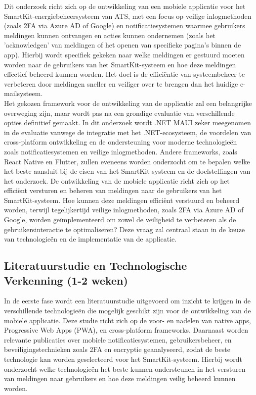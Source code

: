 \noindent Dit onderzoek richt zich op de ontwikkeling van een mobiele applicatie voor het SmartKit-energiebeheersysteem van ATS, met een focus op veilige inlogmethoden (zoals 2FA via Azure AD of Google) en notificatiesystemen waarmee gebruikers meldingen kunnen ontvangen en acties kunnen ondernemen (zoals het 'acknowledgen' van meldingen of het openen van specifieke pagina's binnen de app). Hierbij wordt specifiek gekeken naar welke meldingen er gestuurd moeten worden naar de gebruikers van het SmartKit-systeem en hoe deze meldingen effectief beheerd kunnen worden. Het doel is de efficiëntie van systeembeheer te verbeteren door meldingen sneller en veiliger over te brengen dan het huidige e-mailsysteem. \\

\noindent Het gekozen framework voor de ontwikkeling van de applicatie zal een belangrijke overweging zijn, maar wordt pas na een grondige evaluatie van verschillende opties definitief gemaakt. In dit onderzoek wordt .NET MAUI zeker meegenomen in de evaluatie vanwege de integratie met het .NET-ecosysteem, de voordelen van cross-platform ontwikkeling en de ondersteuning voor moderne technologieën zoals notificatiesystemen en veilige inlogmethoden. Andere frameworks, zoals React Native en Flutter, zullen eveneens worden onderzocht om te bepalen welke het beste aansluit bij de eisen van het SmartKit-systeem en de doelstellingen van het onderzoek. De ontwikkeling van de mobiele applicatie richt zich op het efficiënt versturen en beheren van meldingen naar de gebruikers van het SmartKit-systeem. Hoe kunnen deze meldingen efficiënt verstuurd en beheerd worden, terwijl tegelijkertijd veilige inlogmethoden, zoals 2FA via Azure AD of Google, worden geïmplementeerd om zowel de veiligheid te verbeteren als de gebruikersinteractie te optimaliseren? Deze vraag zal centraal staan in de keuze van technologieën en de implementatie van de applicatie.

\subsection{Literatuurstudie en Technologische \\Verkenning (1-2 weken)}
\noindent In de eerste fase wordt een literatuurstudie uitgevoerd om inzicht te krijgen in de verschillende technologieën die mogelijk geschikt zijn voor de ontwikkeling van de mobiele applicatie. Deze studie richt zich op de voor- en nadelen van native apps, Progressive Web Apps (PWA), en cross-platform frameworks. Daarnaast worden relevante publicaties over mobiele notificatiesystemen, gebruikersbeheer, en beveiligingstechnieken zoals 2FA en encryptie geanalyseerd, zodat de beste technologie kan worden geselecteerd voor het SmartKit-systeem. Hierbij wordt onderzocht welke technologieën het beste kunnen ondersteunen in het versturen van meldingen naar gebruikers en hoe deze meldingen veilig beheerd kunnen worden. \\

